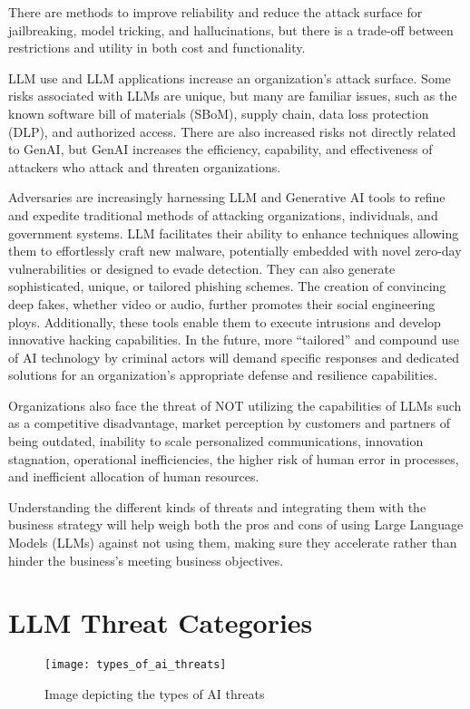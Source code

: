 There are methods to improve reliability and reduce the attack surface for
jailbreaking, model tricking, and hallucinations, but there is a trade-off
between restrictions and utility in both cost and functionality.

LLM use and LLM applications increase an organization's attack surface. Some
risks associated with LLMs are unique, but many are familiar issues, such as
the known software bill of materials (SBoM), supply chain, data loss protection
(DLP), and authorized access. There are also increased risks not directly
related to GenAI, but GenAI increases the efficiency, capability, and
effectiveness of attackers who attack and threaten organizations.

Adversaries are increasingly harnessing LLM and Generative AI tools to refine
and expedite traditional methods of attacking organizations, individuals, and
government systems. LLM facilitates their ability to enhance techniques
allowing them to effortlessly craft new malware, potentially embedded with
novel zero-day vulnerabilities or designed to evade detection. They can also
generate sophisticated, unique, or tailored phishing schemes. The creation of
convincing deep fakes, whether video or audio, further promotes their social
engineering ploys. Additionally, these tools enable them to execute intrusions
and develop innovative hacking capabilities. In the future, more “tailored”
and compound use of AI technology by criminal actors will demand specific
responses and dedicated solutions for an organization's appropriate defense and
resilience capabilities.

Organizations also face the threat of NOT utilizing the capabilities of LLMs
such as a competitive disadvantage, market perception by customers and partners
of being outdated, inability to scale personalized communications, innovation
stagnation, operational inefficiencies, the higher risk of human error in
processes, and inefficient allocation of human resources.

Understanding the different kinds of threats and integrating them with the
business strategy will help weigh both the pros and cons of using Large
Language Models (LLMs) against not using them, making sure they accelerate
rather than hinder the business's meeting business objectives.

\section{LLM Threat Categories}
\begin{figure}[h]
  \centering
  \texttt{[image: types\_of\_ai\_threats]}
  \caption{Image depicting the types of AI threats}
  \label{fig:types-of-ai-threats}
\end{figure}

